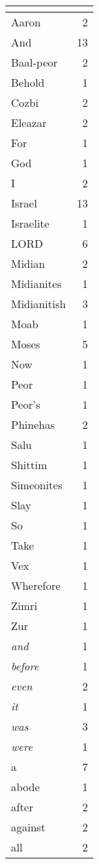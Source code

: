 \begin{center}
\begin{longtable}{l|r}
\hline \multicolumn{2}{c}{{ }} \\ \hline
\endfoot 
Aaron & 2\\ \hline 
And & 13\\ \hline 
Baal-peor & 2\\ \hline 
Behold & 1\\ \hline 
Cozbi & 2\\ \hline 
Eleazar & 2\\ \hline 
For & 1\\ \hline 
God & 1\\ \hline 
I & 2\\ \hline 
Israel & 13\\ \hline 
Israelite & 1\\ \hline 
LORD & 6\\ \hline 
Midian & 2\\ \hline 
Midianites & 1\\ \hline 
Midianitish & 3\\ \hline 
Moab & 1\\ \hline 
Moses & 5\\ \hline 
Now & 1\\ \hline 
Peor & 1\\ \hline 
Peor's & 1\\ \hline 
Phinehas & 2\\ \hline 
Salu & 1\\ \hline 
Shittim & 1\\ \hline 
Simeonites & 1\\ \hline 
Slay & 1\\ \hline 
So & 1\\ \hline 
Take & 1\\ \hline 
Vex & 1\\ \hline 
Wherefore & 1\\ \hline 
Zimri & 1\\ \hline 
Zur & 1\\ \hline 
\emph{and} & 1\\ \hline 
\emph{before} & 1\\ \hline 
\emph{even} & 2\\ \hline 
\emph{it} & 1\\ \hline 
\emph{was} & 3\\ \hline 
\emph{were} & 1\\ \hline 
a & 7\\ \hline 
abode & 1\\ \hline 
after & 2\\ \hline 
against & 2\\ \hline 
all & 2\\ \hline 

\end{longtable}
\end{center}
